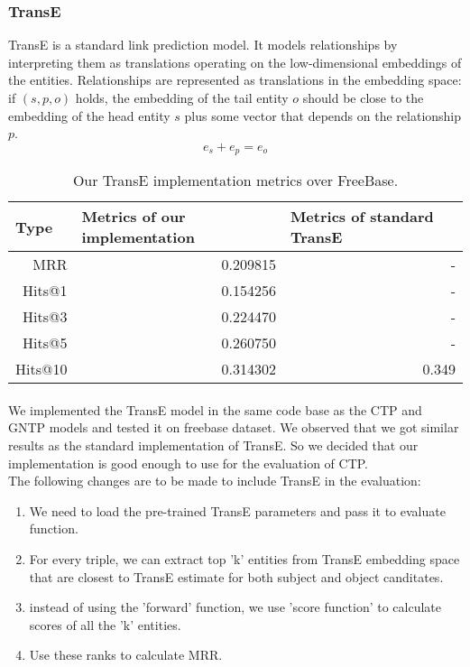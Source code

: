 \documentclass[Other]{iitddiss}
\begin{document}
\subsubsection{TransE}
TransE is a standard link prediction model. It models relationships by interpreting them as translations operating on the low-dimensional embeddings of the entities. Relationships are represented as translations in the embedding space: if \((s,p,o)\) holds, the embedding of the tail entity \(o\) should be close to the embedding of the head entity \(s\) plus some vector that depends on the relationship \(p\).
\[e_{s} + e_{p} = e_{o}\]

\begin{table}[H]
	\centering
	\begin{tabular}{|r|r|r|}
		\hline
		\multicolumn{1}{|l|}{\textbf{Type}} & \multicolumn{1}{l|}{\textbf{Metrics of our implementation}}  & \multicolumn{1}{l|}{\textbf{Metrics of standard TransE}} \\ \hline
		MRR                                    & 0.209815 &		-                                     \\ \hline
		Hits@1                                    & 0.154256           & -                       \\ \hline
		Hits@3                                    & 0.224470                & -                    \\ \hline
		Hits@5                                    & 0.260750                 & -                   \\ \hline
		Hits@10                                    & 0.314302                & 0.349                    \\ \hline
	\end{tabular}
	\caption{Our TransE implementation metrics over FreeBase. }
	\label{tab:transE_MRR}
\end{table}

\paragraph{}
We implemented the TransE model in the same code base as the CTP and GNTP models and tested it on freebase dataset. We observed that we got similar results as the standard implementation of TransE. So we decided that our implementation is good enough to use for the evaluation of CTP. \\
The following changes are to be made to include TransE in the evaluation:
\begin{enumerate}
\item We need to load the pre-trained TransE parameters and pass it to evaluate function.
\item For every triple, we can extract top 'k' entities from TransE embedding space that are closest to TransE estimate for both subject and object canditates.
\item instead of using the 'forward' function, we use 'score function' to calculate scores of all the 'k' entities.
\item Use these ranks to calculate MRR.
\end{enumerate}
\end{document}
